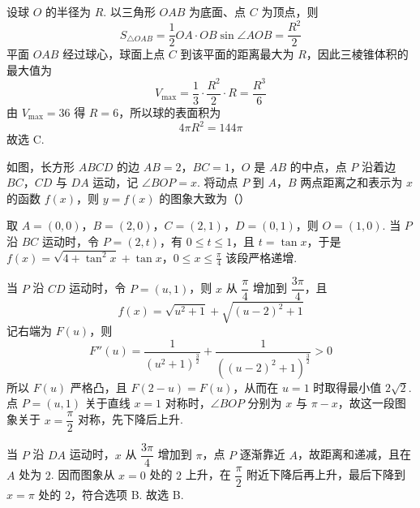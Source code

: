 
\begin{solution}
设球 \(O\) 的半径为 \(R\). 以三角形 \(OAB\) 为底面、点 \(C\) 为顶点，则
\[
S_{\triangle OAB}=\frac12 OA\cdot OB\sin\angle AOB=\frac{R^{2}}{2}
\]
平面 \(OAB\) 经过球心，球面上点 \(C\) 到该平面的距离最大为 \(R\)，因此三棱锥体积的最大值为
\[
V_{\max}=\frac13\cdot\frac{R^{2}}{2}\cdot R=\frac{R^{3}}{6}
\]
由 \(V_{\max}=36\) 得 \(R=6\)，所以球的表面积为
\[
4\pi R^{2}=144\pi
\]
故选 C.
\end{solution}

\begin{problem}
如图，长方形 \(ABCD\) 的边 \(AB = 2\)，\(BC = 1\)，\(O\) 是 \(AB\) 的中点，点 \(P\) 沿着边 \(BC\)，\(CD\) 与 \(DA\) 运动，记 \(\angle BOP = x\). 将动点 \(P\) 到 \(A\)，\(B\) 两点距离之和表示为 \(x\) 的函数 \(f(x)\)，则 \(y = f(x)\) 的图象大致为（\quad）


    {}
    {}
    {}
\end{problem}


\begin{solution}
取 \(A=(0,0)\)，\(B=(2,0)\)，\(C=(2,1)\)，\(D=(0,1)\)，则 \(O=(1,0)\). 当 \(P\) 沿 \(BC\) 运动时，令 \(P=(2,t)\)，有 \(0\leqslant t\leqslant1\)，且 \(t=\tan x\)，于是
\(f(x)=\sqrt{4+\tan^{2}x}+\tan x\)，\(0\leqslant x\leqslant\frac{\pi}{4}\)
该段严格递增.

当 \(P\) 沿 \(CD\) 运动时，令 \(P=(u,1)\)，则 \(x\) 从 \(\dfrac{\pi}{4}\) 增加到 \(\dfrac{3\pi}{4}\)，且
\[
f(x)=\sqrt{u^{2}+1}+\sqrt{(u-2)^{2}+1}
\]
记右端为 \(F(u)\)，则
\[
F''(u)=\frac{1}{(u^{2}+1)^{\frac{3}{2}}}+\frac{1}{((u-2)^{2}+1)^{\frac{3}{2}}}>0
\]
所以 \(F(u)\) 严格凸，且 \(F(2-u)=F(u)\)，从而在 \(u=1\) 时取得最小值 \(2\sqrt2\). 点 \(P=(u,1)\) 关于直线 \(x=1\) 对称时，\(\angle BOP\) 分别为 \(x\) 与 \(\pi-x\)，故这一段图象关于 \(x=\dfrac\pi2\) 对称，先下降后上升.

当 \(P\) 沿 \(DA\) 运动时，\(x\) 从 \(\dfrac{3\pi}{4}\) 增加到 \(\pi\)，点 \(P\) 逐渐靠近 \(A\)，故距离和递减，且在 \(A\) 处为 \(2\). 因而图象从 \(x=0\) 处的 \(2\) 上升，在 \(\dfrac\pi2\) 附近下降后再上升，最后下降到 \(x=\pi\) 处的 \(2\)，符合选项 B. 故选 B.
\end{solution}

